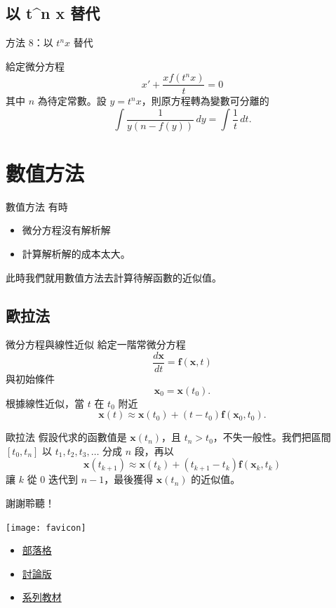 \documentclass{beamer}
\theoremstyle{remark}
\begin{document}
\begin{CJK}{UTF8}{bsmi}
\subsection[以 $t^n x$ 替代]{以 t\textasciicircum n x 替代}
\begin{frame}{方法 8：以 $t^n x$ 替代}
  \begin{theorem}
    給定微分方程
    \[x' + \frac{x f(t^n x)}{t} = 0\]
    其中 $n$ 為待定常數。設 $y = t^n x$，則原方程轉為變數可分離的
    \[\int \frac{1}{y \left( n - f(y) \right)}\,dy = \int \frac1t\,dt.\]
  \end{theorem}
\end{frame}

\section{數值方法}
\begin{frame}{數值方法}
  有時
  \begin{itemize}
    \item 微分方程沒有解析解
    \item 計算解析解的成本太大。
  \end{itemize}
  此時我們就用數值方法去計算待解函數的近似值。
\end{frame}

\subsection{歐拉法}
\begin{frame}{微分方程與線性近似}
  給定一階常微分方程
  \[ \frac{d\mathbf x}{dt} = \mathbf f(\mathbf x,t) \]
  與初始條件
  \[ \mathbf x_0 = \mathbf x(t_0).\]
  根據線性近似，當 $t$ 在 $t_0$ 附近
  \[ \mathbf x(t) \approx \mathbf x(t_0) + \left( t - t_0 \right) \mathbf f(\mathbf x_0, t_0).\]
\end{frame}

\begin{frame}{歐拉法}
  假設代求的函數值是 $\mathbf x(t_n)$，且 $t_n > t_0$，不失一般性。我們把區間 $[t_0, t_n]$
  以 $t_1, t_2, t_3, \dots$ 分成 $n$ 段，再以
  \[ \mathbf x(t_{k+1}) \approx \mathbf x(t_k) + \left( t_{k+1} - t_k \right) \mathbf f(\mathbf x_k, t_k) \]
  讓 $k$ 從 0 迭代到 $n-1$，最後獲得 $\mathbf x(t_n)$ 的近似值。
\end{frame}

\begin{frame}{謝謝聆聽！}
  \begin{center}
    \texttt{[image: favicon]}
  \end{center}
  \begin{itemize}
    \item \href{http://jdh8.org/}{部落格}
    \item \href{http://boards.jdh8.org/cal/}{討論版}
    \item \href{https://github.com/jdh8/calculus-2012}{系列教材}
  \end{itemize}
\end{frame}
\end{CJK}
\end{document}
